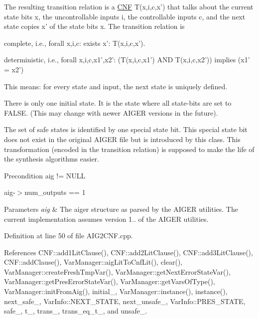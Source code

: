 The resulting transition relation is a \hyperlink{classCNF}{C\-N\-F} T(x,i,c,x') that talks about the current state bits x, the uncontrollable inputs i, the controllable inputs c, and the next state copies x' of the state bits x. The transition relation is 
\begin{DoxyItemize}
\item complete, i.\-e., forall x,i,c\-: exists x'\-: T(x,i,c,x'). 
\item deterministic, i.\-e., forall x,i,c,x1',x2'\-: (T(x,i,c,x1') A\-N\-D T(x,i,c,x2')) implies (x1' = x2') 
\end{DoxyItemize}This means\-: for every state and input, the next state is uniquely defined.

There is only one initial state. It is the state where all state-\/bits are set to F\-A\-L\-S\-E. (This may change with newer A\-I\-G\-E\-R versions in the future).

The set of safe states is identified by one special state bit. This special state bit does not exist in the original A\-I\-G\-E\-R file but is introduced by this class. This transformation (encoded in the transition relation) is supposed to make the life of the synthesis algorithms easier.

\begin{DoxyPrecond}{Precondition}
aig != N\-U\-L\-L 

aig-\/$>$num\-\_\-outputs == 1 
\end{DoxyPrecond}

\begin{DoxyParams}{Parameters}
{\em aig} & The aiger structure as parsed by the A\-I\-G\-E\-R utilities. The current implementation assumes version 1.. of the A\-I\-G\-E\-R utilities. \\
\hline
\end{DoxyParams}


Definition at line 50 of file A\-I\-G2\-C\-N\-F.\-cpp.



References C\-N\-F\-::add1\-Lit\-Clause(), C\-N\-F\-::add2\-Lit\-Clause(), C\-N\-F\-::add3\-Lit\-Clause(), C\-N\-F\-::add\-Clause(), Var\-Manager\-::aig\-Lit\-To\-Cnf\-Lit(), clear(), Var\-Manager\-::create\-Fresh\-Tmp\-Var(), Var\-Manager\-::get\-Next\-Error\-State\-Var(), Var\-Manager\-::get\-Pres\-Error\-State\-Var(), Var\-Manager\-::get\-Vars\-Of\-Type(), Var\-Manager\-::init\-From\-Aig(), initial\-\_\-, Var\-Manager\-::instance(), instance(), next\-\_\-safe\-\_\-, Var\-Info\-::\-N\-E\-X\-T\-\_\-\-S\-T\-A\-T\-E, next\-\_\-unsafe\-\_\-, Var\-Info\-::\-P\-R\-E\-S\-\_\-\-S\-T\-A\-T\-E, safe\-\_\-, t\-\_\-, trans\-\_\-, trans\-\_\-eq\-\_\-t\-\_\-, and unsafe\-\_\-.



